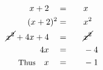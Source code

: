 \begin{alignat*}{5}
&\,&x+2\quad&=\quad&&x\\
&\,&(x+2)^2&=&& x^2\\
&\,&\cancel{x^2}+4x+4\quad&=&&\cancel{x^2}\\
&\,&4x\quad&=&&-4\\
&\,&\small\text{Thus}\normalsize\quad x\quad&=&&-1
\end{alignat*}
